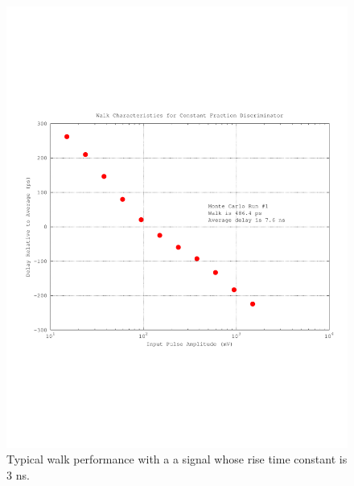 \documentclass[12pt, onecolumn]{IEEEtran}
\begin{document}
\begin{figure}[htbp!]
	\centering
 	\includegraphics[scale=0.85,keepaspectratio=true]{./images/typical_walk.pdf} 	
 	\caption{Typical walk performance with a a signal whose rise time constant is 3 ns.}
 	\label{FIG:TYPICAL_WALK}
\end{figure}
\end{document}
